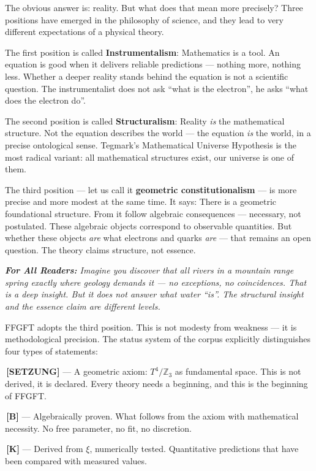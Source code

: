 \documentclass[11pt,oneside]{book}
\newcommand{\status}[1]{\penalty10000\,{\scriptsize\textcolor{gray!60}{[#1]}}}
\newenvironment{laierspur}{%
  \par\vspace{4pt}%
  \noindent\small\itshape\color{blue!60!black}%
  \textbf{For All Readers:}\enspace\ignorespaces}{%
  \par\vspace{4pt}\normalsize\normalfont\normalcolor}
\begin{document}
The obvious answer is: reality. But what does that mean more precisely?
Three positions have emerged in the philosophy of science, and they lead to
very different expectations of a physical theory.

The first position is called \textbf{Instrumentalism}: Mathematics is a tool.
An equation is good when it delivers reliable predictions — nothing more,
nothing less. Whether a deeper reality stands behind the equation is not a
scientific question. The instrumentalist does not ask \enquote{what is the
electron}, he asks \enquote{what does the electron do}.

The second position is called \textbf{Structuralism}: Reality \textit{is} the
mathematical structure. Not the equation describes the world — the equation
\textit{is} the world, in a precise ontological sense. Tegmark's Mathematical
Universe Hypothesis is the most radical variant: all mathematical structures
exist, our universe is one of them.

The third position — let us call it \textbf{geometric constitutionalism} —
is more precise and more modest at the same time. It says: There is a
geometric foundational structure. From it follow algebraic consequences —
necessary, not postulated. These algebraic objects correspond to observable
quantities. But whether these objects \textit{are} what electrons and quarks
\textit{are} — that remains an open question. The theory claims structure,
not essence.

\begin{laierspur}
Imagine you discover that all rivers in a mountain range spring exactly
where geology demands it — no exceptions, no coincidences. That is a deep
insight. But it does not answer what water \enquote{is}. The structural insight and
the essence claim are different levels.
\end{laierspur}

FFGFT adopts the third position. This is not modesty from weakness — it is
methodological precision. The status system of the corpus explicitly
distinguishes four types of statements:

\textbf{\status{SETZUNG}} — A geometric axiom: $T^4/\mathbb{Z}_3$ as fundamental space. This
is not derived, it is declared. Every theory needs a beginning, and this is
the beginning of FFGFT.

\textbf{\status{B}} — Algebraically proven. What follows from the axiom with
mathematical necessity. No free parameter, no fit, no discretion.

\textbf{\status{K}} — Derived from $\xi$, numerically tested. Quantitative predictions
that have been compared with measured values.
\end{document}
